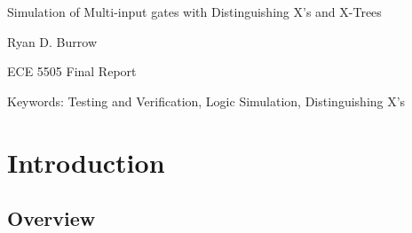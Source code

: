 \documentclass[12pt]{report}
\def \doctitle {Simulation of Multi-input gates with Distinguishing X’s and X-Trees}
\begin{document}
\thispagestyle{empty}
\begin{center}

{\Large 
\doctitle
}

\vfill

Ryan D. Burrow

\vfill

ECE 5505 Final Report

\vfill

\date{\today}

\vfill

Keywords: Testing and Verification, Logic Simulation, Distinguishing X's\\

\end{center}

\pagebreak


\tableofcontents
\pagebreak

\listoffigures

%

\printacronyms[include-classes=acron,name=List of Acronyms]
\pagebreak

\pagestyle{myheadings}


\acresetall

\singlespacing
\chapter{Introduction}\label{sec:intro}
\doublespacing

\section{Overview}
\end{document}
